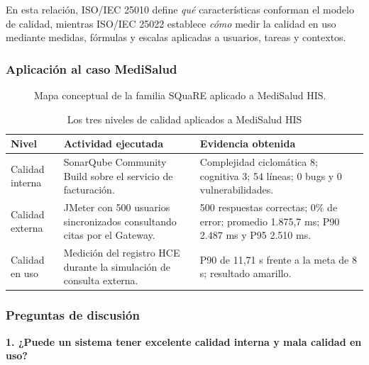 En esta relación, ISO/IEC 25010 define \emph{qué} características conforman el modelo de calidad, mientras ISO/IEC 25022 establece \emph{cómo} medir la calidad en uso mediante medidas, fórmulas y escalas aplicadas a usuarios, tareas y contextos.

\subsubsection{Aplicación al caso MediSalud}

\begin{figure}[H]
\centering
\resizebox{\textwidth}{!}{}
\caption{Mapa conceptual de la familia SQuaRE aplicado a MediSalud HIS.}
\label{fig:square}
\end{figure}


\begin{table}[H]
\centering
\caption{Los tres niveles de calidad aplicados a MediSalud HIS}
\begin{tabularx}{\textwidth}{p{2.4cm}YY}
\toprule
Nivel & Actividad ejecutada & Evidencia obtenida \\
\midrule
Calidad interna & SonarQube Community Build sobre el servicio de facturación. & Complejidad ciclomática 8; cognitiva 3; 54 líneas; 0 bugs y 0 vulnerabilidades. \\
Calidad externa & JMeter con 500 usuarios sincronizados consultando citas por el Gateway. & 500 respuestas correctas; 0\% de error; promedio 1.875,7 ms; P90 2.487 ms y P95 2.510 ms. \\
Calidad en uso & Medición del registro HCE durante la simulación de consulta externa. & P90 de 11,71 s frente a la meta de 8 s; resultado amarillo. \\
\bottomrule
\end{tabularx}
\end{table}


\subsubsection{Preguntas de discusión}

\textbf{1. ¿Puede un sistema tener excelente calidad interna y mala calidad en uso?}

